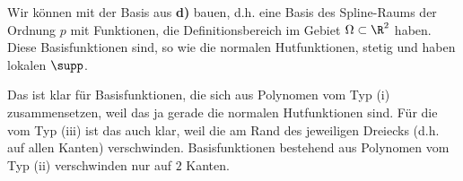 \begin{solution}
\begin{enumerate}[label = \textbf{\alph*)}]
  \begin{comment}

  Ganz Allgemein:

  Sei $B$ eine Polynombasis von $P_p$, und $n := \dim P_p = |B|$.
  Seien $(x_1, y_1), \dots, (x_n, y_n) \in \K^2$ paarweise verschiedene Interpolations-Knoten und $p(x_1, y_1), \dots, p(x_n, y_n) \in \K$ Interpolations-Werte.
  Durch ein lineares Gleichungssystem mit Vandermonde-Matrix bzgl. $B$ und $(x_1, y_1), \dots, (x_n, y_n)$ als linke Seite und $(p(x_1, y_1), \dots, p(x_n, y_n))^T$ als rechte Seite, können wir die Koeffizienten eines eindeutigen Polynoms $p \in P_p$ finden, dass an den Interpolations-Knoten die gewünschten Interpolations-Werte annimmt. \\

  In unserem Fall:

  Wenn wir in Proposition 3.1 von Ordnung $p$ nach $p + 1$ gehen, dann müssen wir $p + 1$ Interpolations-Knoten (aus dem Dreieck) und -Werte hinzufügen.

  Wir wollen, dass unser (durch die lokale Interpolation auf den Dreiecken zusammengesetzter) Spline stetig ist.
  Außerhalb der Kanten ist das immer der Fall.
  Auf den Kanten müssten die angrenzenden Interpolations-Polynome übereinstimmen.

  Das erzielen wir, indem wir beim Ordnungs-Übergang zu jeder Kante genau einen Interpolations-Knoten hinzufügen.
  (Den Rest packen wir ins Innere der Dreiecke.)
  Für jede Kante sind die darauf eingeschränkten Interpolations-Polynome eindeutig bestimmt.
  Insbesondere stimmen angrenzende Polynome darauf überein.

  \end{comment}

  Wir können mit der Basis aus \textbf{d)}  bauen, d.h. eine Basis des Spline-Raums der Ordnung $p$ mit Funktionen, die Definitionsbereich im Gebiet $\Omega \subset \R^2$ haben.
  Diese Basisfunktionen sind, so wie die normalen Hutfunktionen, stetig und haben lokalen $\supp$.

  Das ist klar für Basisfunktionen, die sich aus Polynomen vom Typ (i) zusammensetzen, weil das ja gerade die normalen Hutfunktionen sind.
  Für die vom Typ (iii) ist das auch klar, weil die am Rand des jeweiligen Dreiecks (d.h. auf allen Kanten) verschwinden.
  Basisfunktionen bestehend aus Polynomen vom Typ (ii) verschwinden nur auf $2$ Kanten.


\end{enumerate}
\end{solution}

